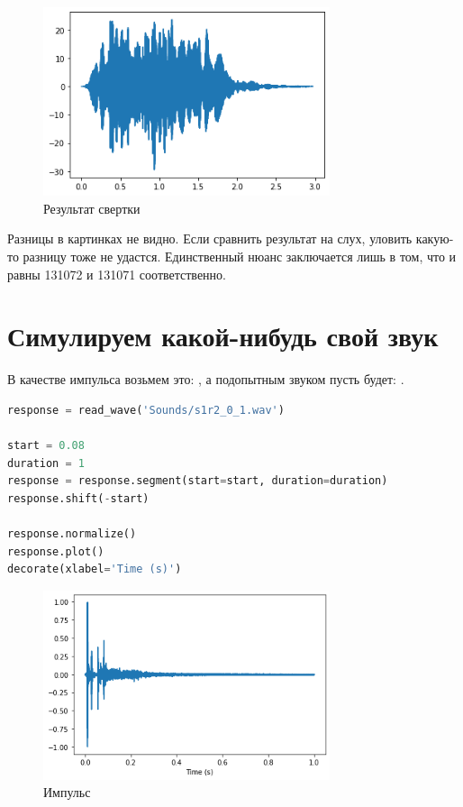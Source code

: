 \documentclass[a4paper,12pt]{report}
\begin{document}
    \begin{figure}[H]
        \centering
        \includegraphics[width=0.75\textwidth]{images/ex1_convolution_1.png}
        \caption{Результат свертки}
        \label{fig:ex1_convolution_1}
    \end{figure}
    
    Разницы в картинках не видно. Если сравнить результат на слух, уловить какую-то разницу тоже не удастся. Единственный нюанс заключается лишь в том, что  и  равны 131072 и 131071 соответственно.

    \chapter{Симулируем какой-нибудь свой звук}
    
    В качестве импульса возьмем это: , а подопытным звуком пусть будет: .
    
\begin{lstlisting}[language=Python,caption=Загрузка импульса]
response = read_wave('Sounds/s1r2_0_1.wav')

start = 0.08
duration = 1
response = response.segment(start=start, duration=duration)
response.shift(-start)

response.normalize()
response.plot()
decorate(xlabel='Time (s)')
\end{lstlisting}

    \begin{figure}[H]
        \centering
        \includegraphics[width=0.75\textwidth]{images/ex2_response_1.png}
        \caption{Импульс}
        \label{fig:ex2_response_1}
    \end{figure}
    
\end{document}
